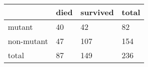   \begin{tabular}{| l | l | l | l |}
    \hline
     & died & survived & total \\ \hline
    mutant & 40 & 42 & 82  \\ \hline
    non-mutant & 47 & 107 & 154  \\ \hline
    total & 87 & 149 & 236 \\ \hline
    \hline
    \end{tabular}
